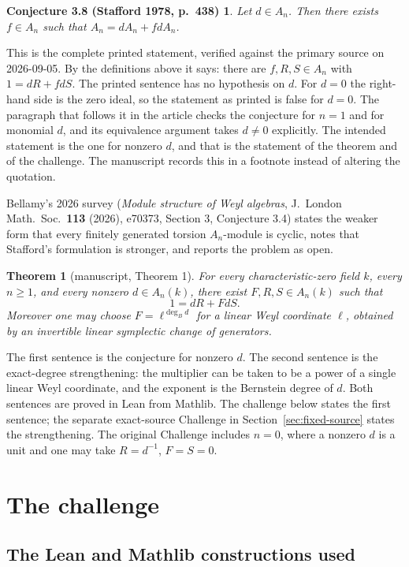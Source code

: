 \documentclass[11pt,a4paper]{article}
\theoremstyle{definition}
\theoremstyle{plain}
\newtheorem*{conjecture*}{Conjecture 3.8 (Stafford 1978, p.\ 438)}
\newtheorem*{theorem*}{Theorem}
\begin{document}
\begin{conjecture*}
Let $d\in A_n$. Then there exists $f\in A_n$ such that $A_n=dA_n+fdA_n$.
\end{conjecture*}

This is the complete printed statement, verified against the primary source
on 2026-09-05. By the definitions above it says: there are $f,R,S\in A_n$ with
$1=dR+fdS$. The printed sentence has no hypothesis on $d$. For $d=0$ the
right-hand side is the zero ideal, so the statement as printed is false for
$d=0$. The paragraph that follows it in the article checks the conjecture for
$n=1$ and for monomial $d$, and its equivalence argument takes $d\ne 0$
explicitly. The intended statement is the one for nonzero $d$, and that is the
statement of the theorem and of the challenge. The manuscript records this in a
footnote instead of altering the quotation.

Bellamy's 2026 survey (\emph{Module structure of Weyl algebras}, J.\ London
Math.\ Soc.\ \textbf{113} (2026), e70373, Section 3, Conjecture 3.4) states the
weaker form that every finitely generated torsion $A_n$-module is cyclic, notes
that Stafford's formulation is stronger, and reports the problem as open.

\begin{theorem*}[manuscript, Theorem 1]
For every characteristic-zero field $k$, every $n\ge 1$, and every nonzero
$d\in A_n(k)$, there exist $F,R,S\in A_n(k)$ such that
\[ 1 = dR + FdS. \]
Moreover one may choose $F=\ell^{\deg_B d}$ for a linear Weyl coordinate
$\ell$, obtained by an invertible linear symplectic change of generators.
\end{theorem*}

The first sentence is the conjecture for nonzero $d$. The second sentence is
the exact-degree strengthening: the multiplier can be taken to be a power of a
single linear Weyl coordinate, and the exponent is the Bernstein degree of
$d$. Both sentences are proved in Lean from Mathlib. The challenge below
states the first sentence; the separate exact-source Challenge in Section~\ref{sec:fixed-source} states the strengthening. The original Challenge includes $n=0$, where a nonzero $d$ is a unit
and one may take $R=d^{-1}$, $F=S=0$.

\section{The challenge}

\subsection{The Lean and Mathlib constructions used}
\end{document}
